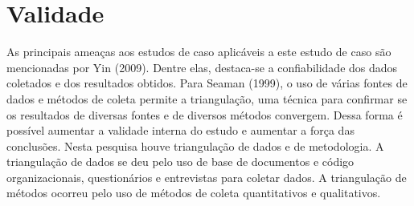 \section[Validade]{Validade}

As principais ameaças aos estudos de caso aplicáveis a este estudo de caso
são mencionadas por Yin (2009). Dentre elas, destaca-se a confiabilidade dos dados
coletados e dos resultados obtidos. Para Seaman (1999), o uso de várias fontes de dados
e métodos de coleta permite a triangulação, uma técnica para confirmar se os resultados
de diversas fontes e de diversos métodos convergem. Dessa forma é possível aumentar a
validade interna do estudo e aumentar a força das conclusões. Nesta pesquisa houve
triangulação de dados  e de metodologia. A triangulação de dados se deu
pelo uso de base de documentos e código organizacionais, questionários e entrevistas para coletar dados. A triangulação
de métodos ocorreu pelo uso de métodos de coleta quantitativos e qualitativos.
